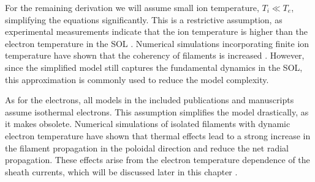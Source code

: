 For the remaining derivation we will assume {small ion temperature}, $T_i \ll T_e$, simplifying the equations significantly. This is a restrictive assumption, as experimental measurements indicate that the ion temperature is higher than the electron temperature in the SOL \cite{kovcan2007ion,kocan2012ion}. Numerical simulations incorporating finite ion temperature have shown that the coherency of filaments is increased \cite{Ahmed_ions}. However, since the simplified model still captures the fundamental dynamics in the SOL, this approximation is commonly used to reduce the model complexity.

As for the electrons, all models in the included publications and manuscripts assume {isothermal electrons}. This assumption simplifies the model drastically, as it makes  obsolete. Numerical simulations of isolated filaments with dynamic electron temperature have shown that thermal effects lead to a strong increase in the filament propagation in the poloidal direction and reduce the net radial propagation. These effects arise from the electron temperature dependence of the sheath currents, which will be discussed later in this chapter \cite{walkden2016dynamics}. 

